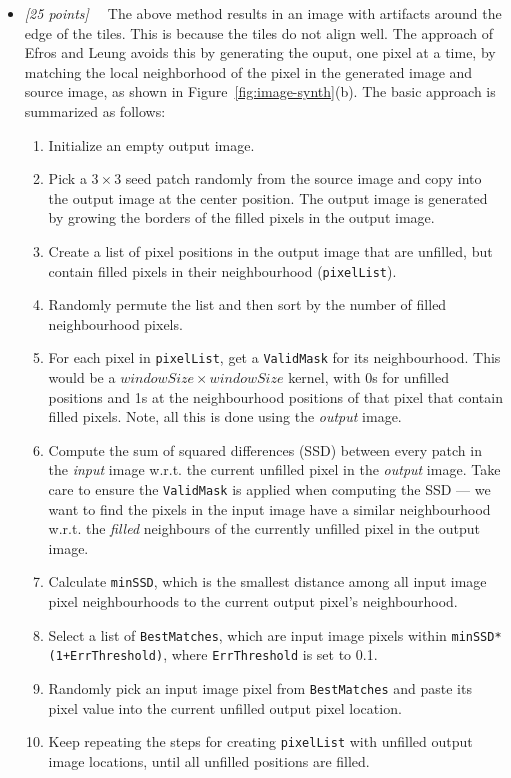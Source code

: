 \documentclass[10pt,letterpaper]{article}
\newcommand{\cmd}[1] {{\color{blue}\texttt{#1}}}
\newcommand{\points}[1]{{\color{mygreen}\emph{[#1]\ \ }}}
\begin{document}
\begin{itemize}
\item \points{25 points} The above method results in an image with artifacts around the edge of the tiles. This is because the tiles do not align well.
  The approach of Efros and Leung avoids this by generating the ouput,
  one pixel at a time, by matching the local neighborhood
  of the pixel in the generated image and source image, as shown in
  Figure~\ref{fig:image-synth}(b).
The basic approach is summarized as follows:
 \begin{enumerate}
   \item Initialize an empty output image.
   \item Pick a $3 \times 3$ seed patch randomly from the source image
     and copy into the output image at the center position. The output
     image is generated by growing the borders of the filled pixels in
     the output image.
   \item Create a list of pixel positions in the output image that are
     unfilled, but contain filled pixels in their neighbourhood
     (\cmd{pixelList}). 
   \item Randomly permute the list and then sort by the number of
     filled neighbourhood pixels.
   \item For each pixel in \cmd{pixelList}, get a \cmd{ValidMask} for
     its neighbourhood. This would be a $windowSize \times windowSize$
     kernel, with 0s for unfilled positions and 1s at the
     neighbourhood positions of that pixel that contain filled
     pixels. Note, all this is done using the \textit{output} image.
   \item Compute the sum of squared differences (SSD) between every
     patch in the \textit{input} image w.r.t. the current unfilled
     pixel in the \textit{output} image. Take care to ensure the
     \cmd{ValidMask} is applied when computing the SSD --- we want to
     find the pixels in the input image have a similar neighbourhood
     w.r.t. the \textit{filled} neighbours of the currently unfilled
     pixel in the output image.
   \item Calculate \cmd{minSSD}, which is the smallest distance among
     all input image pixel neighbourhoods to the current output
     pixel's neighbourhood.
   \item Select a list of \cmd{BestMatches}, which are input image
     pixels within \texttt{minSSD*(1+ErrThreshold)}, where
     \cmd{ErrThreshold} is set to 0.1.
   \item Randomly pick an input image pixel from \cmd{BestMatches} and
     paste its pixel value into the current unfilled output pixel
     location.
   \item Keep repeating the steps for creating \cmd{pixelList} with
     unfilled output image locations, until all unfilled positions are
     filled. 
\end{enumerate}


\end{itemize}
\end{document}

